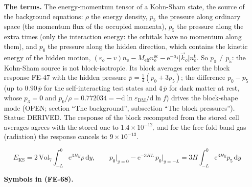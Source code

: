 \documentclass[
  10pt,
]{article}
\begin{document}
\textbf{The terms.} The energy-momentum tensor of a Kohn-Sham state, the
source of the background equations: \(\rho\) the energy density, \(p_3\)
the pressure along ordinary space (the momentum flux of the occupied
momenta), \(p_5\) the pressure along the extra times (only the
interaction energy: the orbitals have no momentum along them), and
\(p_0\) the pressure along the hidden direction, which contains the
kinetic energy of the hidden motion,
\((\varepsilon_o - v)n_o - M_{\mathrm{eff}}n^{\mathrm{sc}}_o - \mathrm{e}^{-a_4}\lvert\vec k_o\rvert n^{\mathrm{t}}_o\).
So \(p_0 \ne p_5\): the Kohn-Sham source is not block-isotropic. Its
block averages enter the block response FE-47 with the hidden pressure
\(\bar p = \frac14(p_0 + 3p_5)\); the difference \(p_0 - p_5\) (up to
\(0.90\,\bar p\) for the self-interacting test states and \(4\,\bar p\)
for dark matter at rest, whose \(p_3 = 0\) and
\(p_0/\rho = 0.772034 = -\mathrm{d}\ln\varepsilon_{\mathrm{DM}}/\mathrm{d}\ln f\))
drives the block-shape mode (OPEN; section ``The background'',
subsection ``The block pressures''). Status: DERIVED. The response of
the block recomputed from the stored cell averages agrees with the
stored one to \(1.4\times10^{-12}\), and for the free fold-band gas
(radiation) the response cancels to \(9\times10^{-13}\).

\[
E_{\mathrm{KS}} = 2\,\mathrm{Vol}_7\int_{-L}^{0}\mathrm{e}^{3Hy}\rho\,\mathrm{d}y,\qquad
p_0\big\vert_{y=0} - \mathrm{e}^{-3HL}\,p_0\big\vert_{y=-L} =
 3H\int_{-L}^{0}\mathrm{e}^{3Hy}p_5\,\mathrm{d}y \tag{FE-68}
\]

\textbf{Symbols in (FE-68).}
\end{document}
